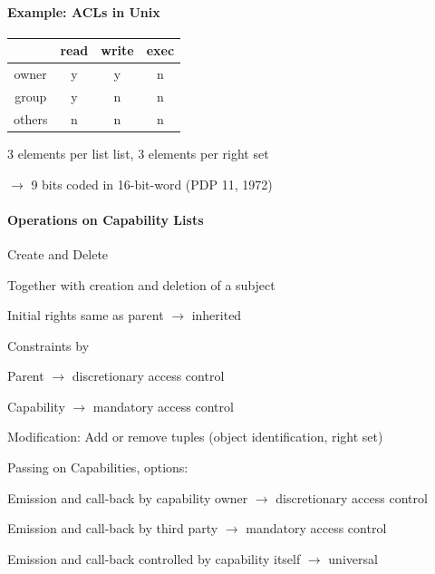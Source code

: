 \documentclass[a4paper]{article}
\begin{document}
\begin{multicols}{3}
    \paragraph{Example: ACLs in Unix}
    \begin{tabular}{c | c | c| c}
               & read & write & exec \\\hline
        owner  & y    & y     & n    \\
        group  & y    & n     & n    \\
        others & n    & n     & n
    \end{tabular}
    \begin{itemize*}
        \item 3 elements per list list, 3 elements per right set
        \item[$\rightarrow$] 9 bits coded in 16-bit-word (PDP 11, 1972)
    \end{itemize*}

    \paragraph{Operations on Capability Lists}
    Create and Delete
    \begin{itemize*}
        \item Together with creation and deletion of a subject
        \item Initial rights same as parent $\rightarrow$ inherited
        \item Constraints by
        \begin{itemize*}
            \item Parent $\rightarrow$ discretionary access control
            \item Capability $\rightarrow$ mandatory access control
        \end{itemize*}
    \end{itemize*}

    Modification: Add or remove tuples (object identification, right set)

    Passing on Capabilities, options:
    \begin{itemize*}
        \item Emission and call-back by capability owner $\rightarrow$ discretionary access control
        \item Emission and call-back by third party $\rightarrow$ mandatory access control
        \item Emission and call-back controlled by capability itself $\rightarrow$ universal
    \end{itemize*}


\end{multicols}
\end{document}
